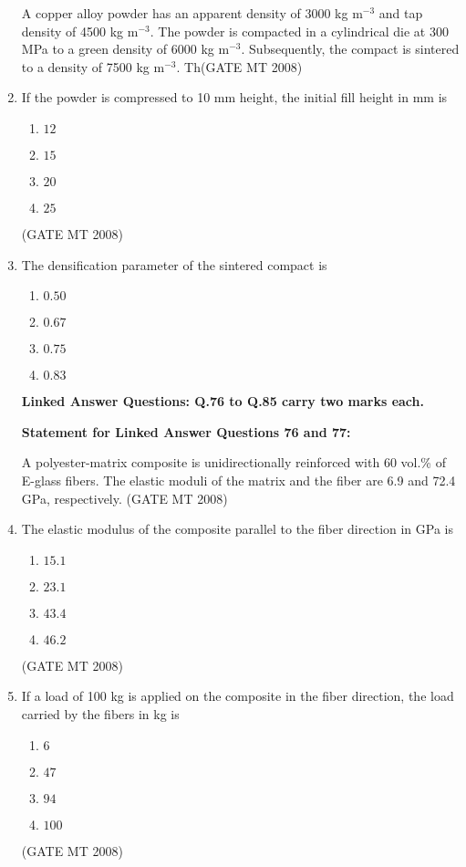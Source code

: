 \documentclass[journal, 11pt, onecolumn]{IEEEtran}
\theoremstyle{remark}
\begin{document}
\begin{enumerate}
A copper alloy powder has an apparent density of 3000 kg m$^{-3}$ and tap density of 4500 kg m$^{-3}$. 
The powder is compacted in a cylindrical die at 300 MPa to a green density of 6000 kg m$^{-3}$. 
Subsequently, the compact is sintered to a density of 7500 kg m$^{-3}$. 
Th(GATE MT 2008)
\item If the powder is compressed to 10 mm height, the initial fill height in mm is
\begin{multicols}{4}
\begin{enumerate} 
\item $12$
\item $15$
\item $20$
\item $25$
\end{enumerate}
\end{multicols}
\hfill(GATE MT 2008)
\item The densification parameter of the sintered compact is
\begin{multicols}{4}
\begin{enumerate} 
\item $0.50$
\item $0.67$
\item $0.75$
\item $0.83$
\end{enumerate}
\end{multicols}


\textbf{Linked Answer Questions: Q.76 to Q.85 carry two marks each.}

\textbf{Statement for Linked Answer Questions 76 and 77:}

A polyester-matrix composite is unidirectionally reinforced with 60 vol.\% of E-glass fibers. 
The elastic moduli of the matrix and the fiber are 6.9 and 72.4 GPa, respectively.
\hfill(GATE MT 2008)
\item The elastic modulus of the composite parallel to the fiber direction in GPa is
\begin{multicols}{4}
\begin{enumerate} 
\item $15.1$
\item $23.1$
\item $43.4$
\item $46.2$
\end{enumerate}
\end{multicols}
\hfill(GATE MT 2008)
\item If a load of 100 kg is applied on the composite in the fiber direction, the load carried by the fibers in kg is
\begin{multicols}{4}
\begin{enumerate} 
\item $6$
\item $47$
\item $94$
\item $100$
\end{enumerate}
\end{multicols}
\hfill(GATE MT 2008)



\end{enumerate}
\end{document}
